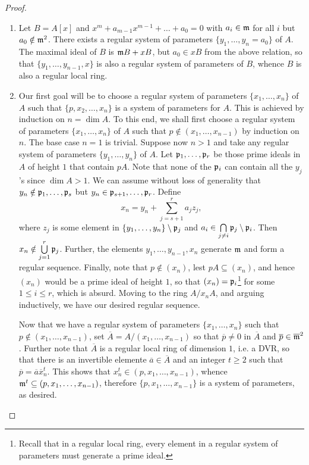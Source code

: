\begin{proof}
\begin{enumerate}[label=(\arabic*)]
    \item Let $B = A[x]$ and $x^m + a_{m - 1}x^{m - 1} + \dots + a_0 = 0$ with $a_i\in\mathfrak{m}$ for all $i$ but $a_0\notin\mathfrak{m}^2$. There exists a regular system of parameters $\{y_1,\dots, y_n = a_0\}$ of $A$. The maximal ideal of $B$ is $\mathfrak{m} B + xB$, but $a_0\in xB$ from the above relation, so that $\{y_1,\dots, y_{n - 1}, x\}$ is also a regular system of parameters of $B$, whence $B$ is also a regular local ring.

    \item Our first goal will be to choose a regular system of parameters $\{x_1,\dots,x_n\}$ of $A$ such that $\{p, x_2,\dots, x_n\}$ is a system of parameters for $A$. This is achieved by induction on $n = \dim A$. To this end, we shall first choose a regular system of parameters $\{x_1,\dots,x_n\}$ of $A$ such that $p\notin (x_1,\dots,x_{n - 1})$ by induction on $n$. The base case $n = 1$ is trivial. Suppose now $n > 1$ and take any regular system of parameters $\{y_1,\dots,y_n\}$ of $A$. Let $\mathfrak{p}_1,\dots,\mathfrak{p}_r$ be those prime ideals in $A$ of height $1$ that contain $pA$. Note that none of the $\mathfrak{p}_i$ can contain all the $y_j$'s since $\dim A > 1$. We can assume without loss of generality that $y_n\notin\mathfrak{p}_1,\dots,\mathfrak{p}_s$ but $y_n\in\mathfrak{p}_{s + 1},\dots,\mathfrak{p}_r$. Define 
    \begin{equation*}
        x_n = y_n + \sum_{j = s + 1}^r a_j z_j,
    \end{equation*}
    where $z_j$ is some element in $\{y_1,\dots,y_n\}\setminus\mathfrak{p}_j$ and $a_i\in\bigcap\limits_{j\ne i}\mathfrak{p}_j\setminus\mathfrak{p}_i$. Then $x_n\notin\bigcup\limits_{j = 1}^r\mathfrak{p}_j$. Further, the elements $y_1,\dots,y_{n - 1}, x_n$ generate $\mathfrak{m}$ and form a regular sequence. Finally, note that $p\notin(x_n)$, lest $pA\subseteq (x_n)$, and hence $(x_n)$ would be a prime ideal of height $1$, so that $(x_n) = \mathfrak{p}_i$\footnote{Recall that in a regular local ring, every element in a regular system of parameters must generate a prime ideal.} for some $1\le i\le r$, which is absurd. Moving to the ring $A/x_n A$, and arguing inductively, we have our desired regular sequence. 

    Now that we have a regular system of parameters $\{x_1,\dots,x_n\}$ such that $p\notin (x_1,\dots,x_{n - 1})$, set $\overline A = A/(x_1,\dots,x_{n - 1})$ so that $\overline p\ne 0$ in $\overline A$ and $\overline p\in\overline{\mathfrak{m}}^2$. Further note that $\overline A$ is a regular local ring of dimension $1$, i.e. a DVR, so that there is an invertible elemente $\overline a\in\overline A$ and an integer $t\ge 2$ such that $\overline{p} = \overline a\overline x_n^t$. This shows that $x_n^t\in (p,x_1,\dots,x_{n - 1})$, whence $\mathfrak{m}^t\subseteq(p,x_1,\dots,x_{n - 1})$, therefore $\{p,x_1,\dots,x_{n - 1}\}$ is a system of parameters, as desired.


\end{enumerate}
\end{proof}
